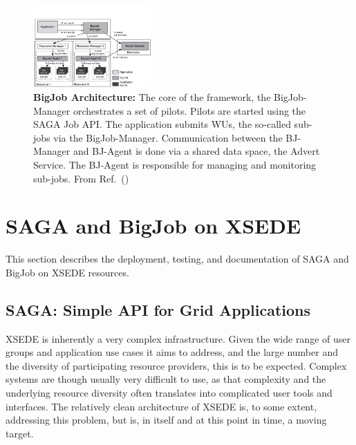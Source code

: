 \documentclass{sig-alternate}
\begin{document}
\begin{figure}[t]
  \centering
  \includegraphics[width=0.40\textwidth]{./figs/re_bigjob_interactions}
   \caption{\textbf{BigJob Architecture:} The core of the framework,
     the BigJob-Manager orchestrates a set of pilots. Pilots are
     started using the SAGA Job API. The application submits WUs, the
     so-called sub-jobs via the BigJob-Manager. Communication between
     the BJ-Manager and BJ-Agent is done via a shared data space, the
     Advert Service. The BJ-Agent is responsible for managing and
     monitoring sub-jobs. From Ref.~(\cite{saga_bigjob_condor_cloud})}
        \label{fig:figures_re_bigjob_interactions}
\end{figure}



\section{SAGA and BigJob on XSEDE}
This section describes the deployment, testing, and documentation of
SAGA and BigJob on XSEDE resources.


\subsection{SAGA: Simple API for Grid Applications}
 \label{ssec:saga}
 
 
XSEDE is inherently a very complex infrastructure.  Given the wide
range of user groups and application use cases it aims to address,
and the large number and the diversity of participating resource
providers, this is to be expected.  Complex systems are though
usually very difficult to use, as that complexity and the underlying
resource diversity often translates into complicated user tools and
interfaces.  The relatively clean architecture of XSEDE is, to some
extent, addressing this problem, but is, in itself and at this point
in time, a moving target.
\end{document}
